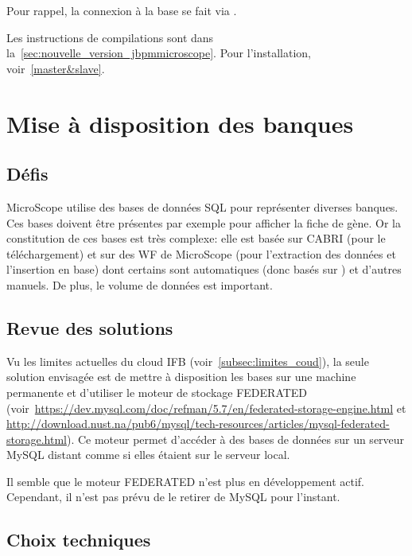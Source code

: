 Pour rappel, la connexion à la base se fait via .

Les instructions de compilations sont dans la~\autoref{sec:nouvelle_version_jbpmmicroscope}.
Pour l'installation, voir~\autoref{master&slave}.

\section{Mise à disposition des banques} \label{sec:acces_banques}

\subsection{Défis}

MicroScope utilise des bases de données SQL pour représenter diverses banques.
Ces bases doivent être présentes par exemple pour afficher la fiche de gène.
Or la constitution de ces bases est très complexe:
elle est basée sur CABRI (pour le téléchargement)
et sur des WF de MicroScope (pour l'extraction des données et l'insertion en base)
dont certains sont automatiques (donc basés sur ) et d'autres manuels.
De plus, le volume de données est important.

\subsection{Revue des solutions}

Vu les limites actuelles du cloud IFB (voir~\autoref{subsec:limites_coud}),
la seule solution envisagée est de mettre à disposition les bases sur une machine permanente et
d'utiliser le moteur de stockage FEDERATED (voir~\url{https://dev.mysql.com/doc/refman/5.7/en/federated-storage-engine.html} et \url{http://download.nust.na/pub6/mysql/tech-resources/articles/mysql-federated-storage.html}).
Ce moteur permet d'accéder à des bases de données sur un serveur MySQL distant comme si elles étaient sur le serveur local.

\begin{warningbox}
    Il semble que le moteur FEDERATED n'est plus en développement actif.
    Cependant, il n'est pas prévu de le retirer de MySQL pour l'instant.
\end{warningbox}

\subsection{Choix techniques}

